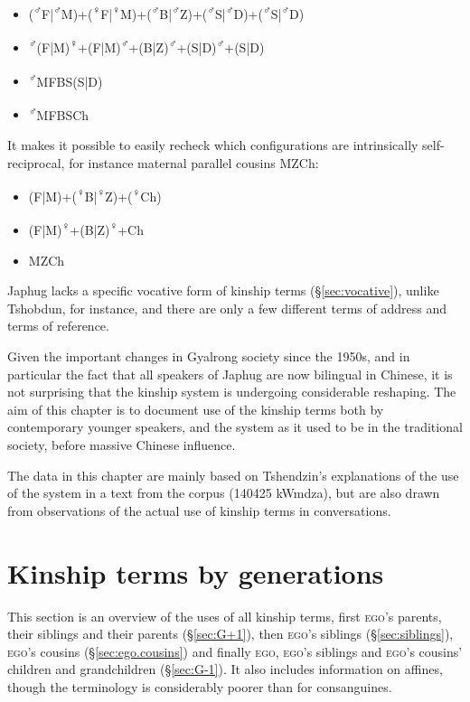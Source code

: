 \begin{itemize}
\item (\textsuperscript{♂}F|\textsuperscript{♂}M)+(\textsuperscript{♀}F|\textsuperscript{♀}M)+(\textsuperscript{♂}B|\textsuperscript{♂}Z)+(\textsuperscript{♂}S|\textsuperscript{♂}D)+(\textsuperscript{♂}S|\textsuperscript{♂}D)
\item \textsuperscript{♂}(F|M)\textsuperscript{♀}+(F|M)\textsuperscript{♂}+(B|Z)\textsuperscript{♂}+(S|D)\textsuperscript{♂}+(S|D)
\item \textsuperscript{♂}MFBS(S|D)
\item \textsuperscript{♂}MFBSCh
\end{itemize}
 
It makes it possible to easily recheck which configurations are intrinsically self-reciprocal, for instance maternal parallel cousins MZCh:

 \begin{itemize}
\item (F|M)+(\textsuperscript{♀}B|\textsuperscript{♀}Z)+(\textsuperscript{♀}Ch)
\item (F|M)\textsuperscript{♀}+(B|Z)\textsuperscript{♀}+Ch
\item MZCh
\end{itemize}
 

Japhug lacks a specific vocative form of kinship terms (§\ref{sec:vocative}), unlike Tshobdun, \citet[133]{jackson98morphology} for instance, and there are only a few different terms of address and terms of reference.

Given the important changes in Gyalrong society since the 1950s, and in particular the fact that all speakers of Japhug are now bilingual in Chinese, it is not surprising that the kinship system is undergoing considerable reshaping. The aim of this chapter is to document use of the kinship terms both by contemporary younger speakers, and the system as it used to be in the traditional society, before massive Chinese influence.

The data in this chapter are mainly based on Tshendzin's explanations of the use of the system in a text from the corpus (140425 kWmdza), but are also drawn from observations of the actual use of kinship terms in conversations.
 
 \section{Kinship terms by generations}  
 This section is an overview of the uses of all kinship terms, first  \textsc{ego}'s parents,  their siblings and their parents (§\ref{sec:G+1}), then \textsc{ego}'s siblings (§\ref{sec:siblings}), \textsc{ego}'s cousins (§\ref{sec:ego.cousins}) and finally  \textsc{ego}, \textsc{ego}'s siblings and \textsc{ego}'s cousins' children and grandchildren (§\ref{sec:G-1}). It also includes information on affines, though the terminology is considerably poorer than for consanguines.
 
